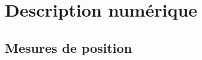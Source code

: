 \documentclass{BeamerTemplate}
\begin{document}

\section{Description numérique}

\subsection{Mesures de position}
\end{document}
